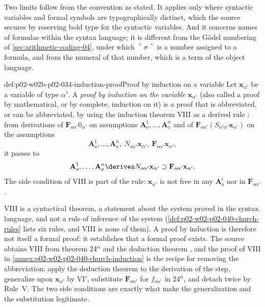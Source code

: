 Two limits follow from the convention as stated.  It applies only where
syntactic variables and formal symbols are typographically distinct, which
the source secures by reserving bold type for the syntactic variables.  And
it concerns names of formulas within the syntax language; it is different
from the G\"odel numbering of \cref{sec:arithmetic-coding-04}, under which
\(\ulcorner\sigma\urcorner\) is a number assigned to a formula, and from the
numeral of that number, which is a term of the object language.

\begin{hbdefinition}{def:p02-w02b-p02-034-induction-proof}{Proof by induction on a variable}
Let \(\mathbf x_{\alpha'}\) be a variable of type \(\alpha'\).  A
\emph{proof by induction on the variable} \(\mathbf x_{\alpha'}\) (also
called a proof by mathematical, or by complete, induction on it) is a proof
that is abbreviated, or can be abbreviated, by using the induction theorem
VIII as a derived rule \cite[\S6, p.~64]{Church1940}: from derivations of
\(\mathbf F_{o\alpha'}0_{\alpha'}\) on assumptions
\(\mathbf A^1_o,\ldots,\mathbf A^n_o\) and of
\(\mathbf F_{o\alpha'}(S_{\alpha'\alpha'}\mathbf x_{\alpha'})\) on the
assumptions
\[
 \mathbf A^1_o,\ldots,\mathbf A^n_o,\ N_{o\alpha'}\mathbf x_{\alpha'},\ \mathbf F_{o\alpha'}\mathbf x_{\alpha'},
\]
it passes to
\[
 \mathbf A^1_o,\ldots,\mathbf A^n_o\derives N_{o\alpha'}\mathbf x_{\alpha'}\supset\mathbf F_{o\alpha'}\mathbf x_{\alpha'}.
\]
The side condition of VIII is part of the rule: \(\mathbf x_{\alpha'}\) is
not free in any \(\mathbf A^i_o\) nor in \(\mathbf F_{o\alpha'}\).
\end{hbdefinition}

VIII is a syntactical theorem, a statement about the system proved in the
syntax language, and not a rule of inference of the system
(\cref{def:p02-w02-p02-040-church-rules} lists six rules, and VIII is none of
them).  A proof by induction is therefore not itself a formal proof: it
establishes that a formal proof exists.  The source obtains VIII from
theorem 24\(^\alpha\) and the deduction theorem \cite[\S6, p.~64]{Church1940},
and the proof of VIII in \cref{annex:p02-w02-p02-040-church-induction} is
the recipe for removing the abbreviation: apply the deduction theorem to the
derivation of the step, generalize upon \(\mathbf x_{\alpha'}\) by VI\('\),
substitute \(\mathbf F_{o\alpha'}\) for \(f_{o\alpha'}\) in 24\(^\alpha\), and
detach twice by Rule~V.  The two side conditions are exactly what make the
generalization and the substitution legitimate.

